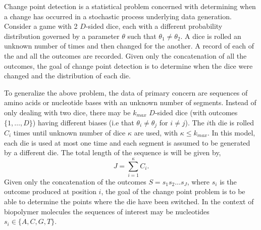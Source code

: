 Change point detection is a statistical problem concerned with determining when a change has occurred in a stochastic process underlying data generation. 
Consider a game with 2 $D$-sided dice, each with a different probability distribution governed by a parameter $\theta$ such that $\theta_1 \neq \theta_2$. A dice is rolled an unknown number of times and then changed for the another. 
A record of each of the and all the outcomes are recorded. Given only the concatenation of all the outcomes, the goal of change point detection is to determine when the dice were changed and the distribution of each die. 

To generalize the above problem, the data of primary concern are sequences of amino acids or nucleotide bases with an unknown number of segments. 
Instead of only dealing with two dice, there may be $k_{max}$ $D$-sided dice (with outcomes $\{1,\ldots,D\}$) having different biases (i.e that $\theta_i\neq \theta_j$ for $i\neq j$). 
The $i$th die is rolled $C_i$ times until unknown number of dice $\kappa$ are used, with $\kappa\leq k_{max}$. In this model, each die is used at most one time and each segment is assumed to be generated by a different die. The total length of the sequence is will be given by, 
    \begin{equation}
        J = \sum_{i=1}^{\kappa}C_i.
    \end{equation}
Given only the concatenation of the outcomes $S = s_1s_2\ldots s_J$, where $s_i$ is the outcome produced at position $i$, the goal of the change point problem is to be able to determine the points where the die have been switched. In the context of biopolymer molecules the sequences of interest may be nucleotides $s_i \in \{A,C,G,T\}$.

